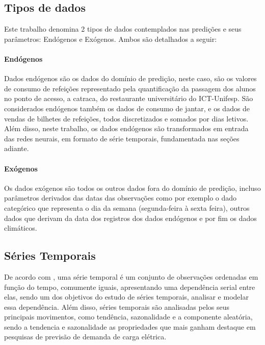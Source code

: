 \subsection{Tipos de dados}
  
Este trabalho denomina 2 tipos de dados contemplados nas predições e seus parâmetros: 
Endógenos e Exógenos. Ambos são detalhados a seguir:
            
\paragraph{Endógenos}
Dados endógenos são os dados do domínio de predição, neste caso, são os valores de consumo de refeições representado pela quantificação da passagem dos alunos no ponto de acesso, a catraca, do restaurante universitário do ICT-Unifesp.
São considerados endógenos também os dados de consumo de jantar, e os dados de vendas de bilhetes de refeições, todos discretizados e somados por dias letivos. Além disso, neste trabalho, os dados endógenos são transformados em entrada das redes neurais, em formato de série temporais, fundamentada nas seções adiante.
            
\paragraph{Exógenos}
Os dados exógenos são todos os outros dados fora do domínio de predição, incluso parâmetros derivados das datas das observações como por exemplo o dado categórico que representa o dia da semana (segunda-feira à sexta feira), outros dados que derivam da data dos registros dos dados endógenos e por fim os dados climáticos.
          
          
\subsection{Séries Temporais}


De acordo com  , uma série temporal é um conjunto de observações ordenadas em função do tempo, comumente iguais, apresentando uma dependência serial entre elas, sendo um dos objetivos do estudo de séries temporais, analisar e modelar essa dependência. Além disso, séries temporais são analisadas pelos seus principais movimentos, como tendência, sazonalidade e a componente aleatória, sendo a tendencia e sazonalidade as propriedades que mais ganham destaque em pesquisas de previsão de demanda de carga elétrica.

